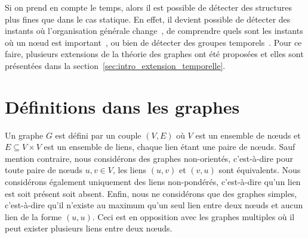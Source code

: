 Si on prend en compte le temps, alors il est possible de détecter des structures plus fines que dans le cas statique.
En effet, il devient possible de détecter des instants où l'organisation générale change~\cite{Rosvall2010}, de comprendre quels sont les instants où un n\oe{}ud est important~\cite{Magnien2015,Costa2015,Takaguchi2016}, ou bien de détecter des groupes temporels~\cite{Cazabet2010}.
Pour ce faire, plusieurs extensions de la théorie des graphes ont été proposées et elles sont présentées dans la section~\ref{sec:intro_extension_temporelle}.


\section{Définitions dans les graphes}
\label{sec:def_graphe}

Un graphe $G$ est défini par un couple $(V, E)$  où $V$ est un ensemble de n\oe{}uds et $E \subseteq V \times V$ est un ensemble de liens, chaque lien étant une paire de n\oe{}uds.
Sauf mention contraire, nous considérons des graphes non-orientés, c'est-à-dire pour toute paire de n\oe{}uds $u,v \in V$, les liens $(u,v)$ et $(v,u)$ sont équivalents.
Nous considérons également uniquement des liens non-pondérés, c'est-à-dire qu'un lien est soit présent soit absent.
Enfin, nous ne considérons que des graphes simples, c'est-à-dire qu'il n'existe au maximum qu'un seul lien entre deux n\oe{}uds et aucun lien de la forme $(u,u)$.
Ceci est en opposition avec les graphes multiples où il peut exister plusieurs liens entre deux n\oe{}uds.


